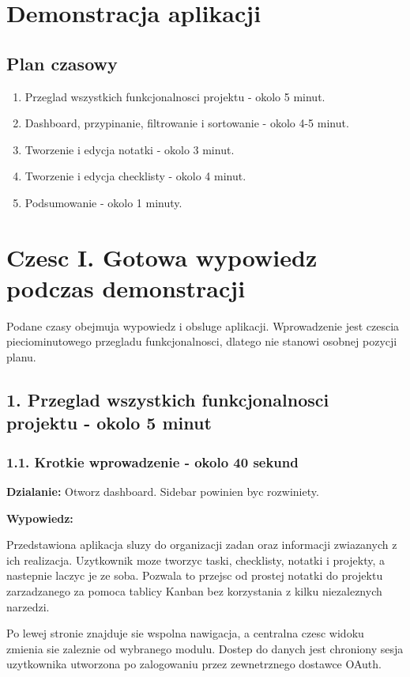 \documentclass[
  polish,
  12pt,
  a4paper,
]{article}
\author{}
\date{}
\providecommand{\tightlist}{%
  \setlength{\itemsep}{0pt}\setlength{\parskip}{0pt}}
\renewenvironment{quote}
  {\list{}{\leftmargin=1.2em\rightmargin=0.6em}%
   \item\relax\color{black}\setlength{\parskip}{0.7em}}
  {\endlist}
\begin{document}
\section{Demonstracja aplikacji}\label{demonstracja-aplikacji}

\subsection{Plan czasowy}\label{plan-czasowy}

\begin{enumerate}
\def\labelenumi{\arabic{enumi}.}
\tightlist
\item
  Przeglad wszystkich funkcjonalnosci projektu - okolo 5 minut.
\item
  Dashboard, przypinanie, filtrowanie i sortowanie - okolo 4-5 minut.
\item
  Tworzenie i edycja notatki - okolo 3 minut.
\item
  Tworzenie i edycja checklisty - okolo 4 minut.
\item
  Podsumowanie - okolo 1 minuty.
\end{enumerate}

\section{Czesc I. Gotowa wypowiedz podczas
demonstracji}\label{czesc-i-gotowa-wypowiedz-podczas-demonstracji}

Podane czasy obejmuja wypowiedz i obsluge aplikacji. Wprowadzenie jest
czescia pieciominutowego przegladu funkcjonalnosci, dlatego nie stanowi
osobnej pozycji planu.

\subsection{1. Przeglad wszystkich funkcjonalnosci projektu - okolo 5
minut}\label{1-przeglad-wszystkich-funkcjonalnosci-projektu---okolo-5-minut}

\subsubsection{1.1. Krotkie wprowadzenie - okolo 40
sekund}\label{11-krotkie-wprowadzenie---okolo-40-sekund}

\textbf{Dzialanie:} Otworz dashboard. Sidebar powinien byc rozwiniety.

\textbf{Wypowiedz:}

\begin{quote}
Przedstawiona aplikacja sluzy do organizacji zadan oraz informacji
zwiazanych z ich realizacja. Uzytkownik moze tworzyc taski, checklisty,
notatki i projekty, a nastepnie laczyc je ze soba. Pozwala to przejsc od
prostej notatki do projektu zarzadzanego za pomoca tablicy Kanban bez
korzystania z kilku niezaleznych narzedzi.

Po lewej stronie znajduje sie wspolna nawigacja, a centralna czesc
widoku zmienia sie zaleznie od wybranego modulu. Dostep do danych jest
chroniony sesja uzytkownika utworzona po zalogowaniu przez zewnetrznego
dostawce OAuth.
\end{quote}
\end{document}
